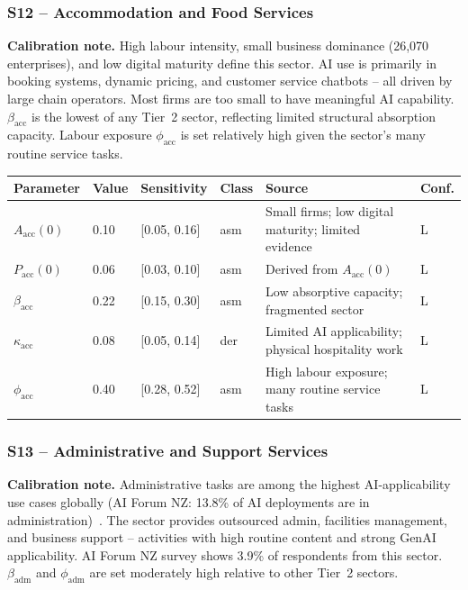 \documentclass[11pt,a4paper]{article}
\begin{document}
\subsubsection*{S12 -- Accommodation and Food Services}

\textbf{Calibration note.} High labour intensity, small business dominance (26,070 enterprises), and low digital maturity define this sector. AI use is primarily in booking systems, dynamic pricing, and customer service chatbots -- all driven by large chain operators. Most firms are too small to have meaningful AI capability. $\beta_{\text{acc}}$ is the lowest of any Tier~2 sector, reflecting limited structural absorption capacity. Labour exposure $\phi_{\text{acc}}$ is set relatively high given the sector's many routine service tasks.

\begin{center}
\begin{tabular}{llllll}
\toprule
Parameter & Value & Sensitivity & Class & Source & Conf.\\
\midrule
$A_{\text{acc}}(0)$ & 0.10 & [0.05, 0.16] & asm & Small firms; low digital maturity; limited evidence & L \\
$P_{\text{acc}}(0)$ & 0.06 & [0.03, 0.10] & asm & Derived from $A_{\text{acc}}(0)$ & L \\
$\beta_{\text{acc}}$ & 0.22 & [0.15, 0.30] & asm & Low absorptive capacity; fragmented sector & L \\
$\kappa_{\text{acc}}$ & 0.08 & [0.05, 0.14] & der & Limited AI applicability; physical hospitality work & L \\
$\phi_{\text{acc}}$ & 0.40 & [0.28, 0.52] & asm & High labour exposure; many routine service tasks & L \\
\bottomrule
\end{tabular}
\end{center}

\subsubsection*{S13 -- Administrative and Support Services}

\textbf{Calibration note.} Administrative tasks are among the highest AI-applicability use cases globally (AI Forum NZ: 13.8\% of AI deployments are in administration)~\cite{aiforum2024}. The sector provides outsourced admin, facilities management, and business support -- activities with high routine content and strong GenAI applicability. AI Forum NZ survey shows 3.9\% of respondents from this sector. $\beta_{\text{adm}}$ and $\phi_{\text{adm}}$ are set moderately high relative to other Tier~2 sectors.
\end{document}
